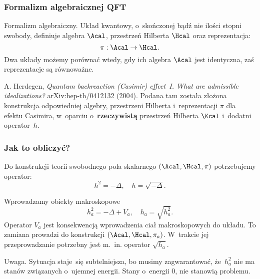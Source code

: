 \documentclass[10pt,t]{beamer}
\begin{document}
\begin{frame}
  \frametitle{Formalizm algebraicznej QFT}


  Formalizm algebraiczny. Układ kwantowy, o~skończonej bądź nie ilości
  stopni swobody, definiuje algebra $\Acal$, przestrzeń Hilberta $\Hcal$
  oraz reprezentacja:
  \begin{equation}
    \label{eq:Efekt-Casimira-10}
    \pi: \Acal \to \Hcal.
  \end{equation}
  Dwa układy możemy porównać wtedy, gdy ich algebra $\Acal$ jest
  identyczna, zaś reprezentacje są równoważne.



  A. Herdegen, \textit{Quantum backreaction (Casimir) effect~I.
    What are admissible idealizations?} arXiv:hep-th/0412132 (2004).
  Podana tam została złożona konstrukcja odpowiedniej algebry,
  przestrzeni Hilberta i~reprezentacji $\pi$ dla efektu Casimira,
  w~oparciu o~\textbf{rzeczywistą} przestrzeń Hilberta $\Kcal$ i~dodatni
  operator~$h$.

\end{frame}





\begin{frame}
  \frametitle{Jak to obliczyć?}


  Do konstrukcji teorii swobodnego pola skalarnego $( \Acal, \Hcal, \pi )$
  potrzebujemy operator:
  \begin{equation}
    \label{eq:Efekt-Casimira-11}
    h^{ 2 } = -\Delta, \quad
    h = \sqrt{ -\Delta }.
  \end{equation}

  Wprowadzamy obiekty makroskopowe
  \begin{equation}
    \label{eq:Efekt-Casimira-12}
    h_{ a }^{ 2 } = -\Delta + V_{ a }, \quad
    h_{ a } = \sqrt{ h_{ a }^{ 2 } }.
  \end{equation}
  Operator $V_{ a }$ jest konsekwencją wprowadzenia ciał
  makroskopowych do układu. To zamiana prowadzi do konstrukcji
  $( \Acal, \Hcal, \pi_{ a } )$. W~trakcie jej przeprowadzanie potrzebny
  jest m.~in. operator $\sqrt{ h_{ a } }$.

  Uwaga. Sytuacja staje~się subtelniejsza, bo musimy zagwarantować,
  że~$h_{ a }^{ 2 }$ nie ma stanów związanych o~ujemnej energii.
  Stany o~energii 0, nie stanowią problemu.

\end{frame}
\end{document}
